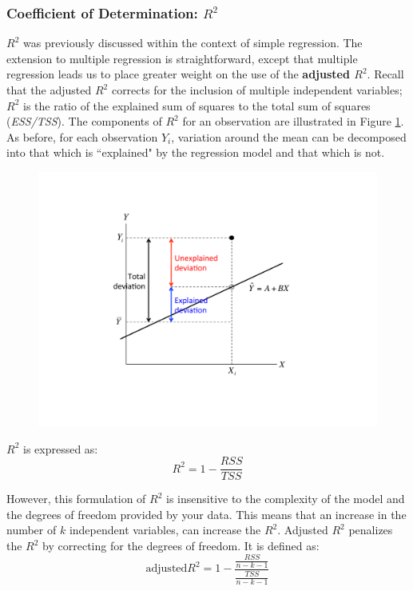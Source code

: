 \documentclass[11pt,openany]{book}\usepackage[]{graphicx}\usepackage[]{color}
\begin{document}
{\subsubsection{Coefficient of Determination: $R^2$}

$R^2$ was previously discussed within the context of simple regression. The extension to multiple regression is straightforward, except that multiple regression leads us to place greater weight on the use of the \textbf{adjusted $R^2$}. Recall that the adjusted $R^2$ corrects for the inclusion of multiple independent variables; $R^{2}$ is the ratio of the explained sum of squares to the total sum of squares (\textit{ESS/TSS}). The components of $R^{2}$ for an observation are illustrated in Figure \ref{fig:rsq}. As before, for each observation $Y_{i}$, variation around the mean can be decomposed into that which is ``explained" by the regression model and that which is not.  
\begin{figure}
  \centering
  \includegraphics[width=5in]{13_ModelFit/rsquared.pdf}
  \caption[$R^{2}$]{ \label{fig:rsq}}
\end{figure}

$R^2$ is expressed as: 
\begin{equation}
 R^{2} = 1-\frac{RSS}{TSS}  
\end{equation}

However, this formulation of $R^2$ is insensitive to the complexity of the model and the degrees of freedom provided by your data. This means that an increase in the number of $k$ independent variables, can increase the $R^2$. Adjusted $R^2$ penalizes the $R^2$ by correcting for the degrees of freedom. It is defined as: 
\begin{equation}
 \text{adjusted} R^2 = 1-\frac{\frac{RSS}{n-k-1}}{\frac{TSS}{n-k-1}}
\end{equation}

}
\end{document}
